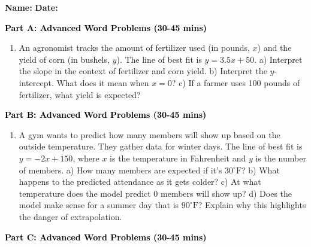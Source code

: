 \documentclass[12pt, letterpaper, fleqn]{article}
\begin{document}
\textbf{Name:} \underline{\hspace{5cm}}
\hfill
\textbf{Date:} \underline{\hspace{3cm}}\\


\begin{tcolorbox}[colback=customteal!20]
\large\textcolor{black}{\textbf{Part A: Advanced Word Problems (30-45 mins)}}
\end{tcolorbox}

\vspace{3mm}

\begin{enumerate}[itemsep=5.5cm, leftmargin=0.6cm]
\item An agronomist tracks the amount of fertilizer used (in pounds, $x$) and the yield of corn (in bushels, $y$). The line of best fit is $y = 3.5x + 50$. 
a) Interpret the slope in the context of fertilizer and corn yield.
b) Interpret the $y$-intercept. What does it mean when $x=0$?
c) If a farmer uses 100 pounds of fertilizer, what yield is expected?
\end{enumerate}

\newpage

\begin{tcolorbox}[colback=customteal!20]
\large\textcolor{black}{\textbf{Part B: Advanced Word Problems (30-45 mins)}}
\end{tcolorbox}

\vspace{3mm}

\begin{enumerate}[itemsep=5.5cm, leftmargin=0.6cm, resume]
\item A gym wants to predict how many members will show up based on the outside temperature. They gather data for winter days. The line of best fit is $y = -2x + 150$, where $x$ is the temperature in Fahrenheit and $y$ is the number of members.
a) How many members are expected if it's $30^\circ\text{F}$?
b) What happens to the predicted attendance as it gets colder?
c) At what temperature does the model predict 0 members will show up? 
d) Does the model make sense for a summer day that is $90^\circ\text{F}$? Explain why this highlights the danger of extrapolation.
\end{enumerate}

\newpage

\begin{tcolorbox}[colback=customteal!20]
\large\textcolor{black}{\textbf{Part C: Advanced Word Problems (30-45 mins)}}
\end{tcolorbox}
\end{document}
